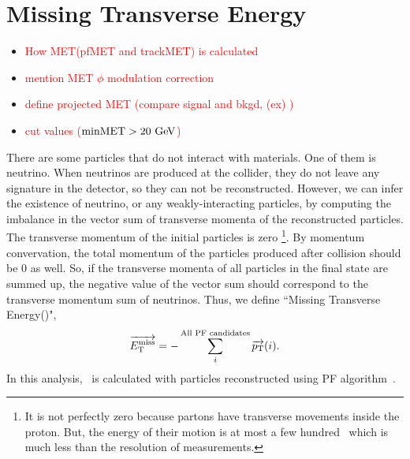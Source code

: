 \section{ Missing Transverse Energy }
\begin{itemize}
\item \textcolor{red}{How MET(pfMET and trackMET) is calculated } 
\item \textcolor{red}{mention MET $\phi$ modulation correction }
\item \textcolor{red}{define projected MET (compare signal and bkgd, (ex) \ztt)}
\item \textcolor{red}{cut values ($\textrm{minMET} > 20~\mathrm{Ge\kern -0.1em V}$) }
\end{itemize}
There are some particles that do not interact with materials. One of them is neutrino.
When neutrinos are produced at the collider, they do not leave any signature 
in the detector, so they can not be reconstructed. However, we can infer 
the existence of neutrino, or any weakly-interacting particles, by computing 
the imbalance in the vector sum of transverse momenta of the reconstructed particles.
The transverse momentum of the initial particles is zero 
\footnote{It is not perfectly zero because partons have transverse movements 
inside the proton. But, the energy of their motion is at most a few hundred \MeV\
which is much less than the resolution of measurements.}.
By momentum convervation, the total momentum of the particles produced 
after collision should be 0 as well. 
So, if the transverse momenta of all particles in the final state are summed up, 
the negative value of the vector sum should correspond to the transverse momentum 
sum of neutrinos. Thus, we define ``Missing Transverse Energy(\met)", 
\begin{eqnarray} 
\overrightarrow{E_\mathrm{T}^{\mathrm{miss}}} = - \sum^{\textrm{All PF candidates}}_i \overrightarrow{p_\mathrm{T}}(i).
\end{eqnarray} 
In this analysis, \met\ is calculated with particles reconstructed using PF algorithm~\cite{}.

